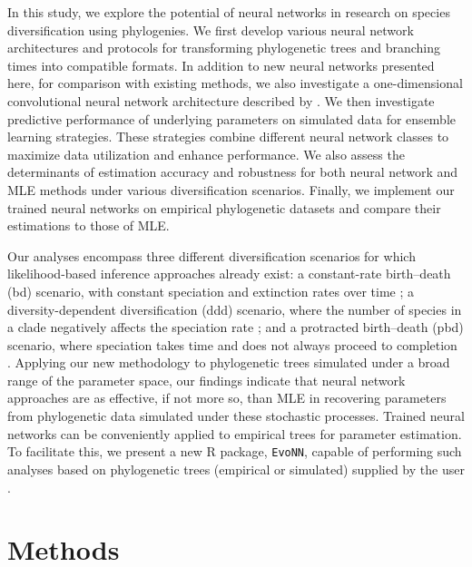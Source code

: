 {In this study, we explore the potential of neural networks in research on species diversification using phylogenies. We first develop various neural network architectures and protocols for transforming phylogenetic trees and branching times into compatible formats. In addition to new neural networks presented here, for comparison with existing methods, we also investigate a one-dimensional convolutional neural network architecture described by \citet{voznica_deep_2022, lajaaiti_comparison_2023}. We then investigate predictive performance of underlying parameters on simulated data for ensemble learning strategies. These strategies combine different neural network classes to maximize data utilization and enhance performance. We also assess the determinants of estimation accuracy and robustness for both neural network and MLE methods under various diversification scenarios. Finally, we implement our trained neural networks on empirical phylogenetic datasets and compare their estimations to those of MLE.

Our analyses encompass three different diversification scenarios for which likelihood-based inference approaches already exist: a constant-rate birth--death (\acrshort{bd}) scenario, with constant speciation and extinction rates over time \citep{stadler_simulating_2011}; a diversity-dependent diversification (\acrshort{ddd}) scenario, where the number of species in a clade negatively affects the speciation rate \citep{etienne_diversity-dependence_2012}; and a protracted birth--death (\acrshort{pbd}) scenario, where speciation takes time and does not always proceed to completion \citep{rosindell_protracted_2010}. Applying our new methodology to phylogenetic trees simulated under a broad range of the parameter space, our findings indicate that neural network approaches are as effective, if not more so, than MLE in recovering parameters from phylogenetic data simulated under these stochastic processes. Trained neural networks can be conveniently applied to empirical trees for parameter estimation. To facilitate this, we present a new R package, \texttt{EvoNN}, capable of performing such analyses based on phylogenetic trees (empirical or simulated) supplied by the user \citep{qin_evonn_2024}.

\section{Methods}
\label{ch2::sec::methods}
}
